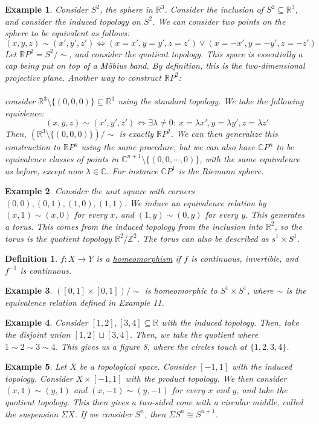 \documentclass{article}
\newcommand{\R}{\mathbb{R}}
\newcommand{\C}{\mathbb{C}}
\newcommand{\Z}{\mathbb{Z}}
\newtheorem{example}{Example}
\newtheorem{definition}{Definition}
\begin{document}
\begin{example}
Consider $S^2$, the sphere in $\R^3$. Consider the inclusion of $S^2\subseteq \R^3$, and consider the induced topology on $S^2$.  We can consider two points on the sphere to be equivalent as follows:
$$(x,y,z)\sim (x',y',z')\iff (x=x',y=y',z=z')\vee (x=-x',y=-y',z=-z')$$
Let $\R P^2 = S^2/\sim$, and consider the quotient topology. This space is essentially a cap being put on top of a M\"obius band. By definition, this is the two-dimensional projective plane. Another way to construct $\R P^2$:\\
\\
consider $\R^3\setminus\{(0,0,0)\}\subseteq \R^3$ using the standard topology. We take the following equivlence:
$$(x,y,z)\sim (x',y',z')\iff \exists \lambda \neq 0:\ x=\lambda x', y=\lambda y', z=\lambda z'$$
Then, $(\R^3\setminus\{(0,0,0)\})/\sim$ is exactly $\R P^2$. We can then generalize this construction to $\R P^n$ using the same procedure, but we can also have $\C P^n$ to be equivalence classes of points in $\C^{n+1}\setminus\{(0,0,\cdots,0)\}$, with the same equivalence as before, except now $\lambda\in \C$. For instance $\C P^1$ is the Riemann sphere. 
\end{example}
\begin{example}
Consider the unit square with corners $(0,0), (0,1), (1,0), (1,1)$. We induce an equivalence relation by $(x,1)\sim (x,0)$ for every $x$, and $(1,y)\sim (0,y)$ for every $y$. This generates a torus. This comes from the induced topology from the inclusion into $\R^2$, so the torus is the quotient topology $\R^2/\Z^2$. The torus can also be described as $s^1\times S^1$.
\end{example}
\begin{definition}
$f:X\rightarrow Y$ is a \underline{homeomorphism} if $f$ is continuous, invertible, and $f^{-1}$ is continuous. 
\end{definition}
\begin{example}
$([0,1]\times [0,1])/\sim$ is homeomorphic to $S^1\times S^1$, where $\sim$ is the equivalence relation defined in Example 11.
\end{example}
\begin{example}
Consider $[1,2],[3,4]\subseteq \R$ with the induced topology. Then, take the disjoint union $[1,2]\sqcup [3,4]$. Then, we take the quotient where $1\sim 2 \sim 3\sim 4$. This gives us a figure 8, where the circles touch at $\{1,2,3,4\}$. 
\end{example}
\begin{example}
Let $X$ be a topological space. Consider $[-1,1]$ with the induced topology. Consider $X\times [-1,1]$ with the product topology. We then consider $(x,1)\sim (y,1)$ and $(x,-1)\sim (y,-1)$ for every $x$ and $y$, and take the quotient topology. This then gives a two-sided cone with a circular middle, called the suspension $\Sigma X$. 
If we consider $S^n$, then $\Sigma S^n\cong S^{n+1}$.
\end{example}
\newpage
\end{document}
